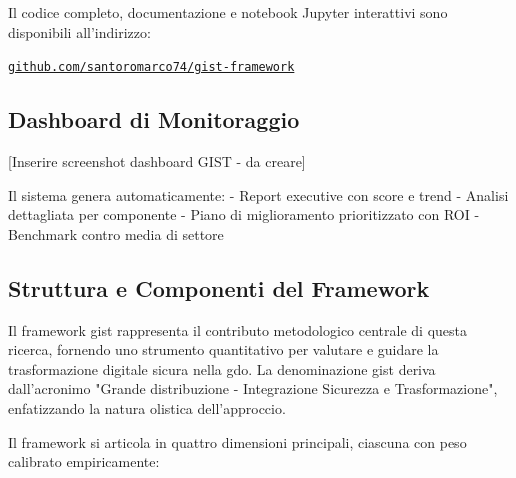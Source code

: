 Il codice completo, documentazione e notebook Jupyter interattivi 
sono disponibili all'indirizzo:

\begin{center}
\large
\href{https://github.com/santoromarco74/gist-framework.git}{\texttt{github.com/santoromarco74/gist-framework}}
\end{center}


\subsection{\texorpdfstring{Dashboard di Monitoraggio}{5.3.4 - Dashboard di Monitoraggio}}

[Inserire screenshot dashboard GIST - da creare]

Il sistema genera automaticamente:
- Report executive con score e trend
- Analisi dettagliata per componente
- Piano di miglioramento prioritizzato con ROI
- Benchmark contro media di settore

\subsection{\texorpdfstring{Struttura e Componenti del Framework}{5.3.1 - Struttura e Componenti del Framework}}
\label{subsec:5.3.1}

Il framework \gls{gist} rappresenta il contributo metodologico centrale di questa ricerca, fornendo uno strumento quantitativo per valutare e guidare la trasformazione digitale sicura nella \gls{gdo}. La denominazione \gls{gist} deriva dall'acronimo "Grande distribuzione - Integrazione Sicurezza e Trasformazione", enfatizzando la natura olistica dell'approccio.

Il framework si articola in quattro dimensioni principali, ciascuna con peso calibrato empiricamente:

